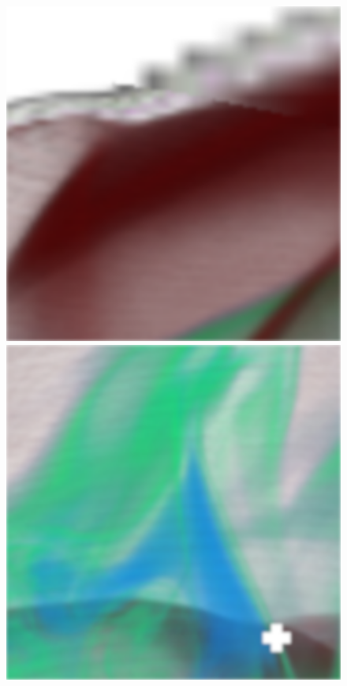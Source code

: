 \begin{figure}[]
	\centering
	\begin{minipage}[t]{0.3\textwidth}
		\centering
		\includegraphics[width=1\textwidth]{../../Neue_Messungen/Supernova/cut/ddc_ors/ddc_ors_1.png}
	\end{minipage}
	\hfill
	\begin{minipage}[t]{0.3\textwidth}
		\centering
		\includegraphics[width=1\textwidth]{../../Neue_Messungen/Supernova/cut/ddc_ors/ddc_ors_2.png}

\end{minipage}
\end{figure}
